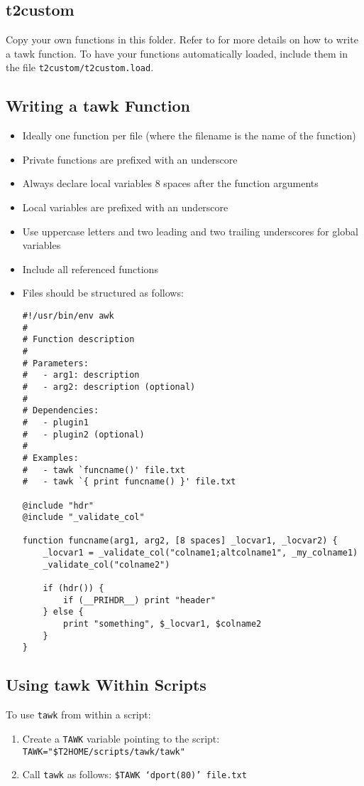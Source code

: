 \documentclass[documentation]{subfiles}
\begin{document}
\subsection{t2custom}\label{t2custom}
Copy your own functions in this folder.
Refer to  for more details on how to write a tawk function.
To have your functions automatically loaded, include them in the file {\tt t2custom/t2custom.load}.

\subsection{Writing a tawk Function}\label{tawk-write-func}
\begin{itemize}
    \item Ideally one function per file (where the filename is the name of the function)
    \item Private functions are prefixed with an underscore
    \item Always declare local variables 8 spaces after the function arguments
    \item Local variables are prefixed with an underscore
    \item Use uppercase letters and two leading and two trailing underscores for global variables
    \item Include all referenced functions
    \item Files should be structured as follows:
\begin{verbatim}
#!/usr/bin/env awk
#
# Function description
#
# Parameters:
#   - arg1: description
#   - arg2: description (optional)
#
# Dependencies:
#   - plugin1
#   - plugin2 (optional)
#
# Examples:
#   - tawk `funcname()' file.txt
#   - tawk `{ print funcname() }' file.txt

@include "hdr"
@include "_validate_col"

function funcname(arg1, arg2, [8 spaces] _locvar1, _locvar2) {
    _locvar1 = _validate_col("colname1;altcolname1", _my_colname1)
    _validate_col("colname2")

    if (hdr()) {
        if (__PRIHDR__) print "header"
    } else {
        print "something", $_locvar1, $colname2
    }
}
\end{verbatim}
\end{itemize}

\subsection{Using tawk Within Scripts}
To use {\tt tawk} from within a script:
\begin{enumerate}
    \item Create a {\tt TAWK} variable pointing to the script: {\tt TAWK="\$T2HOME/scripts/tawk/tawk"}
    \item Call {\tt tawk} as follows: {\tt \$TAWK `dport(80)' file.txt}
\end{enumerate}
\end{document}
